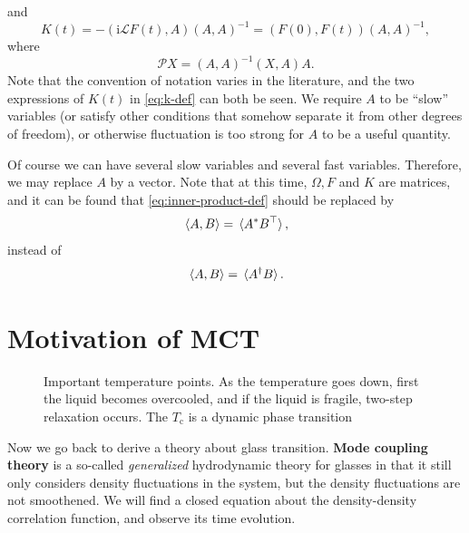 \documentclass[hyperref, a4paper]{article}
\newcommand*{\ii}{\mathrm{i}}
\newcommand*{\concept}[1]{{\textbf{#1}}}
\begin{document}
and 
\begin{equation}
    K(t)=- (\ii \mathcal{L} F(t),A)(A,A)^{-1} = (F(0), F(t)) (A,A)^{-1},
    \label{eq:k-def}
\end{equation}
where 
\begin{equation}
    \mathcal{P} X=(A,A)^{-1}(X,A)A.
\end{equation}
Note that the convention of notation varies in the literature, and the two expressions of $K(t)$ in \eqref{eq:k-def}
can both be seen. We require $A$ to be ``slow'' variables (or satisfy other conditions that somehow separate it 
from other degrees of freedom), or otherwise fluctuation is too strong for $A$ to be a useful quantity.

Of course we can have several slow variables and several fast variables. Therefore, we may replace $A$ by a vector. 
Note that at this time, $\Omega, F$ and $K$ are matrices, and it can be found that \eqref{eq:inner-product-def}
should be replaced by 
\begin{equation}
    \expval*{A, B} = \expval*{A^* B^\top},
\end{equation} 
instead of 
\[
    \expval*{A, B} = \expval*{A^\dagger B}.
\]

\section{Motivation of MCT}

\begin{figure}
    \centering
    
    \caption{Important temperature points. As the temperature goes down, first the liquid becomes overcooled,
    and if the liquid is fragile, two-step relaxation occurs. The $T_\text{c}$ is a dynamic phase transition }
\end{figure}

Now we go back to derive a theory about glass transition. \concept{Mode coupling theory} is a so-called 
\emph{generalized} hydrodynamic theory for glasses \cite{RevModPhys.76.785,Cummins_1999} in that it 
still only considers density fluctuations in the system, but the density fluctuations are not smoothened. 
We will find a closed equation about the density-density correlation function, and observe its time evolution.
\end{document}
